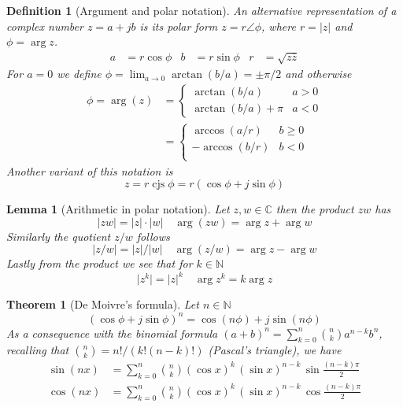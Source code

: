\documentclass[twocolumn, margin=small]{tex/hsrzf}
\newcommand\Nset{\mathbb{N}}
\newcommand\Cset{\mathbb{C}}
\DeclareMathOperator\cjs{cjs}
\newcommand\conj[1]{\overline{#1}}
\newcommand\len[1]{\lvert#1\rvert}
\theoremstyle{komfourzf}
\newtheorem{theorem}{Theorem}
\newtheorem{definition}{Definition}
\newtheorem{lemma}{Lemma}
\begin{document}
\begin{definition}[Argument and polar notation]
  An alternative representation of a complex number \(z = a + jb\) is its \emph{polar form} \(z = r \angle \phi\), where \(r = \len{z}\) and \(\phi = \arg{z}\).
  \begin{align*}
    a &= r\cos\phi &
    b &= r \sin\phi &
    r &= \sqrt{z\conj{z}}
  \end{align*}
  For \(a = 0\) we define \(\phi = \lim_{a\to 0} \arctan(b/a) = \pm\pi/2\) and otherwise
  \begin{align*}
    \phi = \arg(z)
    &= \begin{cases}
      \arctan(b/a) & a > 0 \\
      \arctan(b/a) + \pi & a < 0
    \end{cases} \\
    &= \begin{cases}
      \arccos(a/r) & b \geq 0 \\
      -\arccos(b/r) & b < 0 \\
    \end{cases}
  \end{align*}
  Another variant of this notation is
  \[
    z = r\cjs\phi = r(\cos\phi + j\sin\phi)
  \]
\end{definition}

\begin{lemma}[Arithmetic in polar notation]
  Let \(z,w\in\Cset\) then the product \(zw\) has
  \[
    \len{zw} = \len{z}\cdot\len{w} \quad
    \arg(zw) = \arg z + \arg w
  \]
  Similarly the quotient \(z/w\) follows
  \[
    \len{z/w} = \len{z}/\len{w} \quad
    \arg(z/w) = \arg z - \arg w
  \]
  Lastly from the product we see that for \(k \in \Nset\)
  \[
    \len{z^k} = \len{z}^k \quad
    \arg{z^k} = k \arg{z}
  \]
\end{lemma}

\begin{theorem}[De Moivre's formula]
  Let \(n \in\Nset\)
  \[
    \left(\cos\phi + j\sin\phi\right)^n = \cos(n\phi) + j\sin(n\phi)
  \]
  As a consequence with the binomial formula
  \((a + b)^n = \sum_{k=0}^n \binom{n}{k} a^{n-k} b^n\), recalling that \(\binom{n}{k} = n!/(k!(n-k)!)\) (Pascal's triangle), we have
  \begin{align*}
    \sin(nx)&=\sum _{k=0}^{n}{\binom {n}{k}}(\cos x)^{k}\,(\sin x)^{n-k}\,\sin {\frac {(n-k)\pi }{2}}\\
    \cos(nx)&=\sum _{k=0}^{n}{\binom {n}{k}}(\cos x)^{k}\,(\sin x)^{n-k}\,\cos {\frac {(n-k)\pi }{2}}
  \end{align*}
\end{theorem}
\end{document}
